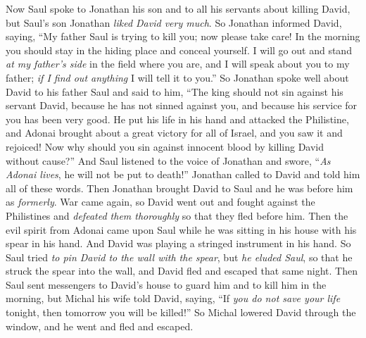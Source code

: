 \begin{biblechapter} %
 Now Saul spoke to Jonathan his son and to all his servants about killing David, but Saul’s son Jonathan \textit{liked David very much}.
\verse So Jonathan informed David, saying, “My father Saul is trying to kill you; now please take care! In the morning you should stay in the hiding place and conceal yourself.
\verse I will go out and stand \textit{at my father’s side} in the field where you are, and I will speak about you to my father; \textit{if I find out anything} I will tell it to you.”
\verse So Jonathan spoke well about David to his father Saul and said to him, “The king should not sin against his servant David, because he has not sinned against you, and because his service for you has been very good.
\verse He put his life in his hand and attacked the Philistine, and Adonai brought about a great victory for all of Israel, and you saw it and rejoiced! Now why should you sin against innocent blood by killing David without cause?”
\verse And Saul listened to the voice of Jonathan and swore, “\textit{As Adonai lives}, he will not be put to death!”
\verse Jonathan called to David and told him all of these words. Then Jonathan brought David to Saul and he was before him as \textit{formerly}.
 War came again, so David went out and fought against the Philistines and \textit{defeated them thoroughly} so that they fled before him.
\verse Then the evil spirit from Adonai came upon Saul while he was sitting in his house with his spear in his hand. And David was playing a stringed instrument in his hand.
\verse So Saul tried \textit{to pin David to the wall with the spear}, but \textit{he eluded Saul}, so that he struck the spear into the wall, and David fled and escaped that same night.
\verse Then Saul sent messengers to David’s house to guard him and to kill him in the morning, but Michal his wife told David, saying, “If \textit{you do not save your life} tonight, then tomorrow you will be killed!”
\verse So Michal lowered David through the window, and he went and fled and escaped.

\end{biblechapter}
